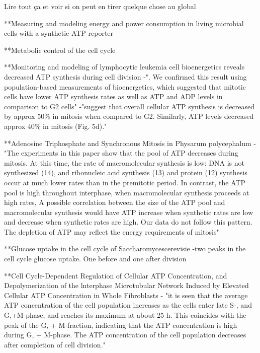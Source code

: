 \documentclass[11pt,a4paper]{article}
\begin{document}
Lire tout ça et voir si on peut en tirer quelque chose au global

**Measuring and modeling energy and power consumption in living microbial cells with a synthetic ATP reporter

**Metabolic control of the cell cycle

**Monitoring and modeling of lymphocytic leukemia cell bioenergetics reveals decreased ATP synthesis during cell division
-". We confirmed this result using population-based measurements of bioenergetics, which suggested that mitotic cells have lower ATP synthesis rates as well as ATP and ADP levels in comparison to G2 cells"
-"suggest that overall cellular ATP synthesis is decreased by approx 50\% in mitosis when compared to G2. Similarly, ATP levels decreased  approx 40\% in mitosis (Fig. 5d)." 

**Adenosine Triphosphate and Synchronous Mitosis in Physarum polycephalum
-"The experiments in this paper show that the pool of ATP decreases during mitosis. At this time, the rate of macromolecular synthesis is low: DNA is not synthesized (14), and ribonucleic acid synthesis (13) and protein (12) synthesis occur at much lower rates than in the premitotic period. In contrast, the ATP pool is high throughout interphase, when macromolecular synthesis proceeds at high rates, A possible correlation between the size of the ATP pool and macromolecular synthesis would have ATP increase when synthetic rates are low and decrease when synthetic rates are high. Our data do not follow this pattern. The depletion of ATP may reflect the energy requirements of
mitosis"

**Glucose uptake in the cell cycle of Saccharomycescerevisie
-two peaks in the cell cycle glucose uptake. One before and one after division


**Cell Cycle-Dependent Regulation of Cellular ATP Concentration, and Depolymerization of the lnterphase Microtubular Network Induced by Elevated Cellular ATP Concentration in Whole Fibroblasts
- "it is seen that the average ATP concentration of the cell population increases as the cells enter late S-, and G,+M-phase, and reaches its maximum at about 25 h. This coincides with the peak of the G, + M-fraction, indicating that the ATP concentration is high during G, + M-phase. The ATP concentration of the cell population decreases after completion of cell division."
\end{document}
